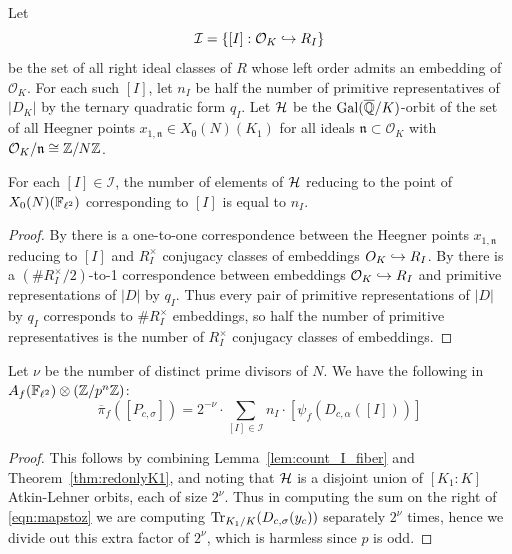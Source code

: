 \documentclass{article} \usepackage[active]{srcltx}
\newcommand{\cI}{\mathcal{I}}
\newcommand{\n}{\mathfrak{n}}
\renewcommand{\O}{\mathcal{O}}
\begin{document}
Let 
$$
\cI = \{[I] : \O_K \hra R_I\}
$$
be the set of all right ideal classes of $R$ whose left order admits
an embedding of $\O_K$.  For each such $[I]$, let $n_I$ be half the
number of primitive representatives of $|D_K|$ by the ternary
quadratic form $q_I$.  Let $\mathcal{H}$ be the $\operatorname{Gal}(\overline{\mathbb{Q}}/K)$-orbit of the
set of all Heegner points $x_{1,\n} \in X_0(N)(K_1)$ for all ideals
$\n\subset \O_K$ with $\O_K/\n \isom \Z/N\Z$.
\begin{lemma}\label{lem:count_I_fiber}
For each $[I] \in \cI$, 
the number of elements of $\mathcal{H}$ reducing to the point of
$X_0(N)(\mathbb{F}_{\ell^2})$ corresponding to $[I]$
is equal to $n_I$.
\end{lemma}
\begin{proof}
  By \cite[\S2]{jetchev-kane:equi} there is a one-to-one
  correspondence between the Heegner points $x_{1,\n}$ reducing to
  $[I]$ and $R_I^{\times}$ conjugacy classes of embeddings $O_K\hookrightarrow
  R_I$.  
By \cite[Prop.~4.2]{jetchev-kane:equi} there is a
  $(\#R_I^{\times}/2)$-to-1 correspondence between embeddings $\O_K \hra
  R_I$ and primitive representations of $|D|$ by $q_I$.
Thus every pair of  primitive representations of $|D|$ by $q_I$
corresponds to $\#R_I^{\times}$ embeddings, so half the
number of primitive representatives is the number
of $R_I^\times$ conjugacy classes of embeddings. 
\end{proof}


\begin{theorem}\label{thm:mapstoz}
Let $\nu$ be the number of distinct prime divisors of $N$.
We have the following in $A_f(\mathbb{F}_{\ell^2}) \otimes (\mathbb{Z}/p^n\mathbb{Z})$:
\begin{equation}\label{eqn:mapstoz}
\overline{\pi}_f ([P_{c,\sigma}]) =  
     2^{-\nu}\cdot \sum_{[I]\in \cI} n_I \cdot [\psi_f \left(D_{c,\alpha} ([I]) \right)] 
   \end{equation}
 \end{theorem}
\begin{proof}
  This follows by combining Lemma~\ref{lem:count_I_fiber} and
  Theorem~\ref{thm:redonlyK1}, and noting that $\mathcal{H}$ is a disjoint
  union of $[K_1:K]$ Atkin-Lehner orbits, each of size $2^{\nu}$.
  Thus in computing the sum on the right of \eqref{eqn:mapstoz} we are
  computing $\operatorname{Tr}_{K_1/K}(D_{c,\sigma}(y_c))$ separately $2^{\nu}$
  times, hence we divide out this extra factor of $2^{\nu}$, which is
  harmless since $p$ is odd.
\end{proof}
\end{document}
